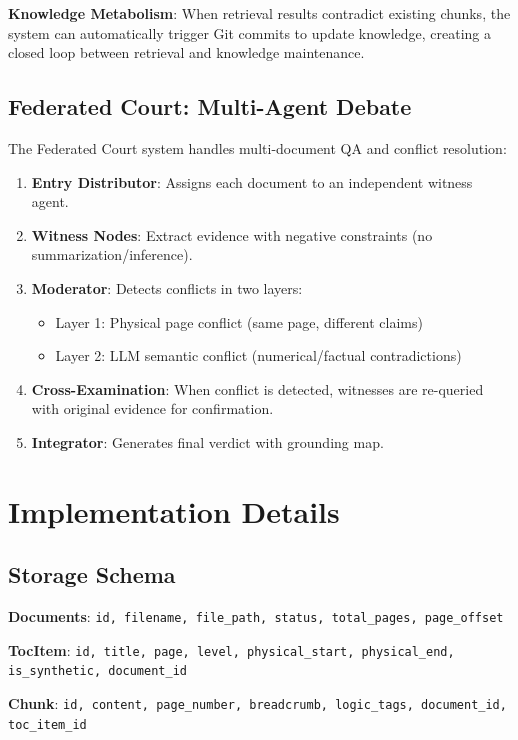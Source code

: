 \documentclass[11pt]{article}
\begin{document}
\textbf{Knowledge Metabolism}: When retrieval results contradict existing chunks, the system can automatically trigger Git commits to update knowledge, creating a closed loop between retrieval and knowledge maintenance.

\subsection{Federated Court: Multi-Agent Debate}

The Federated Court system handles multi-document QA and conflict resolution:

\begin{enumerate}
    \item \textbf{Entry Distributor}: Assigns each document to an independent witness agent.
    \item \textbf{Witness Nodes}: Extract evidence with negative constraints (no summarization/inference).
    \item \textbf{Moderator}: Detects conflicts in two layers:
    \begin{itemize}
        \item Layer 1: Physical page conflict (same page, different claims)
        \item Layer 2: LLM semantic conflict (numerical/factual contradictions)
    \end{itemize}
    \item \textbf{Cross-Examination}: When conflict is detected, witnesses are re-queried with original evidence for confirmation.
    \item \textbf{Integrator}: Generates final verdict with grounding map.
\end{enumerate}

\section{Implementation Details}

\subsection{Storage Schema}

\textbf{Documents}: \texttt{id, filename, file\_path, status, total\_pages, page\_offset}

\textbf{TocItem}: \texttt{id, title, page, level, physical\_start, physical\_end, is\_synthetic, document\_id}

\textbf{Chunk}: \texttt{id, content, page\_number, breadcrumb, logic\_tags, document\_id, toc\_item\_id}
\end{document}
